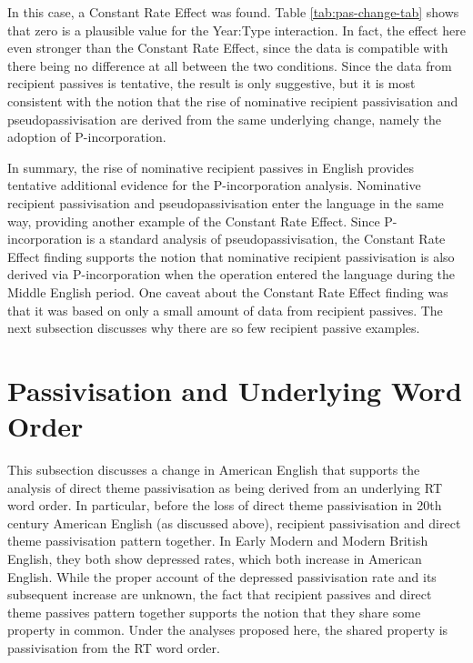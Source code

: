 	In this case, a Constant Rate Effect was found. Table \ref{tab:pas-change-tab} shows that zero is a plausible value for the Year:Type interaction. In fact, the effect here even stronger than the Constant Rate Effect, since the data is compatible with there being no difference at all between the two conditions. Since the data from recipient passives is tentative, the result is only suggestive, but it is most consistent with the notion that the rise of nominative recipient passivisation and pseudopassivisation are derived from the same underlying change, namely the adoption of P-incorporation.



	In summary, the rise of nominative recipient passives in English provides tentative additional evidence for the P-incorporation analysis. Nominative recipient passivisation and pseudopassivisation enter the language in the same way, providing another example of the Constant Rate Effect. Since P-incorporation is a standard analysis of pseudopassivisation, the Constant Rate Effect finding supports the notion that nominative recipient passivisation is also derived via P-incorporation when the operation entered the language during the Middle English period. One caveat about the Constant Rate Effect finding was that it was based on only a small amount of data from recipient passives. The next subsection discusses why there are so few recipient passive examples.

	\section{Passivisation and Underlying Word Order}\label{sec:pasrate}

	This subsection discusses a change in American English that supports the analysis of direct theme passivisation as being derived from an underlying RT word order. In particular, before the loss of direct theme passivisation in 20th century American English (as discussed above), recipient passivisation and direct theme passivisation pattern together. In Early Modern and Modern British English, they both show depressed rates, which both increase in American English. While the proper account of the depressed passivisation rate and its subsequent increase are unknown, the fact that recipient passives and direct theme passives pattern together supports the notion that they share some property in common. Under the analyses proposed here, the shared property is passivisation from the RT word order.

